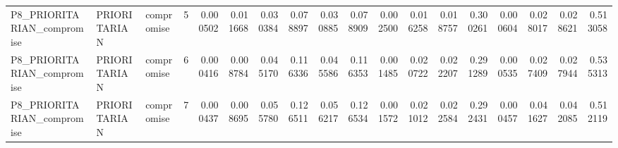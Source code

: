 \begin{tabular}{lllrrrrrrrrrrrrrrr}
P8_PRIORITARIAN_compromise & PRIORITARIAN & compromise & 5 & 0.000502 & 0.011668 & 0.030384 & 0.078897 & 0.030885 & 0.078909 & 0.002500 & 0.016258 & 0.018757 & 0.300261 & 0.000604 & 0.028017 & 0.028621 & 0.513058 \\
P8_PRIORITARIAN_compromise & PRIORITARIAN & compromise & 6 & 0.000416 & 0.008784 & 0.045170 & 0.116336 & 0.045586 & 0.116353 & 0.001485 & 0.020722 & 0.022207 & 0.291289 & 0.000535 & 0.027409 & 0.027944 & 0.535313 \\
P8_PRIORITARIAN_compromise & PRIORITARIAN & compromise & 7 & 0.000437 & 0.008695 & 0.055780 & 0.126511 & 0.056217 & 0.126534 & 0.001572 & 0.021012 & 0.022584 & 0.292431 & 0.000457 & 0.041627 & 0.042085 & 0.512119 \\
\bottomrule
\end{tabular}

